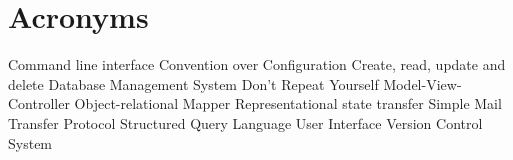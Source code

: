 \newpage
\section{Acronyms}
\begin{acronym}
	  {Command line interface}
	  {Convention over Configuration}
	 {Create, read, update and delete}
	 {Database Management System}
	  {Don't Repeat Yourself}
	  {Model-View-Controller}
	  {Object-relational Mapper}
	 {Representational state transfer}
	 {Simple Mail Transfer Protocol}
	  {Structured Query Language}
		{User Interface}
		{Version Control System}
\end{acronym}
